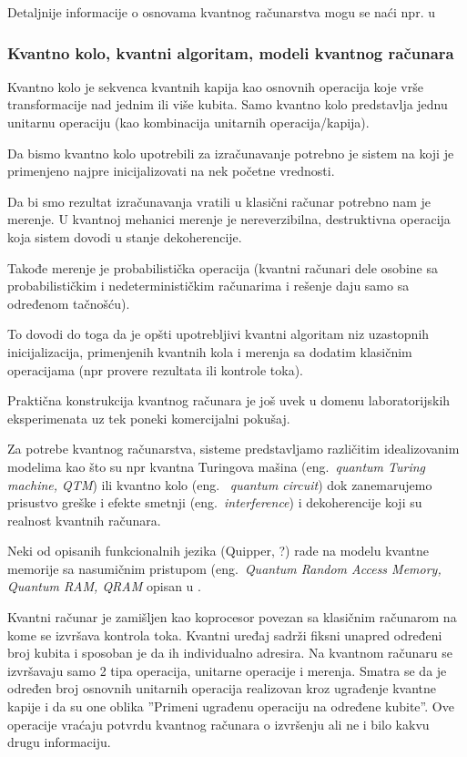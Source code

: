 \documentclass[a4paper]{article}
\begin{document}
{Detaljnije informacije o osnovama kvantnog računarstva mogu se naći npr. u \cite{knjiga}

\subsubsection{Kvantno kolo, kvantni algoritam, modeli kvantnog računara}
\label{modeli}

Kvantno kolo je sekvenca kvantnih kapija kao osnovnih operacija koje vrše transformacije nad jednim ili više kubita. Samo kvantno kolo predstavlja jednu unitarnu operaciju (kao kombinacija unitarnih operacija/kapija).

Da bismo kvantno kolo upotrebili za izračunavanje potrebno je sistem na koji je primenjeno najpre inicijalizovati na nek početne vrednosti.

Da bi smo rezultat izračunavanja vratili u klasični računar potrebno nam je merenje. U kvantnoj mehanici merenje je nereverzibilna, destruktivna operacija koja sistem dovodi u stanje dekoherencije.

Takođe merenje je probabilistička operacija (kvantni računari dele osobine sa probabilističkim i nedeterminističkim računarima i rešenje daju samo sa određenom tačnošću).

To dovodi do toga da je opšti upotrebljivi kvantni algoritam niz uzastopnih inicijalizacija, primenjenih kvantnih kola i merenja sa dodatim klasičnim operacijama (npr provere rezultata ili kontrole toka).

Praktična konstrukcija kvantnog računara je još uvek u domenu laboratorijskih eksperimenata uz tek poneki komercijalni pokušaj.

Za potrebe kvantnog računarstva, sisteme predstavljamo različitim idealizovanim modelima kao što su npr kvantna Turingova mašina (eng.~\emph{quantum Turing machine, QTM}) ili kvantno kolo (eng. ~\emph{quantum circuit}) dok zanemarujemo prisustvo greške i efekte smetnji (eng.~\emph{interference}) i dekoherencije koji su realnost kvantnih računara.

Neki od opisanih funkcionalnih jezika (Quipper, ?) rade na modelu kvantne memorije sa nasumičnim pristupom (eng.~\emph{Quantum Random Access Memory, Quantum RAM, QRAM} opisan u \cite{qram_model}.

Kvantni računar je zamišljen kao koprocesor povezan sa klasičnim računarom na kome se izvršava kontrola toka. Kvantni uređaj sadrži fiksni unapred određeni broj kubita i sposoban je da ih individualno adresira. Na kvantnom računaru se izvršavaju samo 2 tipa operacija, unitarne operacije i merenja.  Smatra se da je određen broj osnovnih unitarnih operacija realizovan kroz ugrađenje kvantne kapije i da su one oblika ''Primeni ugrađenu operaciju na određene kubite''. Ove operacije vraćaju potvrdu kvantnog računara o izvršenju ali ne i bilo kakvu drugu informaciju.

}
\end{document}
